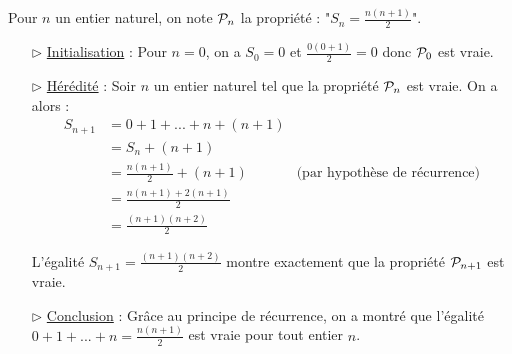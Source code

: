 \begin{sol}
Pour $n$ un entier naturel, on note ${\cal P}_n$ la propri\'et\'e : "$S_n =  \frac{n(n+1)}{2}$".

\begin{itemize}

\item[$\triangleright$]
\underline{Initialisation} : 
Pour $n=0$, on a $S_0 =0$ et $\frac{0(0+1)}{2}=0$ donc ${\cal P}_0$ est vraie.

\item[$\triangleright$]
\underline{H\'er\'edit\'e} : 
Soir $n$ un entier naturel tel que la propri\'et\'e ${\cal P}_n$ est vraie. 
On a alors :
\begin{align*}
S_{n+1} &= 0+1+...+n+(n+1)& \\
	     &=S_n + (n+1)& \\
	     &=\frac{n(n+1)}{2} + (n+1) & {\text {(par hypoth\`ese de r\'ecurrence)}}\\
	     &= \frac{n(n+1) + 2(n+1)}{2}& \\
	&= \frac{(n+1)(n+2)}{2}& 
\end{align*}

L'\'egalit\'e $S_{n+1} = \frac{(n+1)(n+2)}{2}$ montre exactement que la propri\'et\'e ${\cal P}_{n+1}$ est vraie.

\item[$\triangleright$]
\underline {Conclusion} :
Grâce au principe de r\'ecurrence, on a montr\'e que l'\'egalit\'e $0+1+ ...+n =  \frac{n(n+1)}{2}$ est vraie pour tout entier $n$.

\end{itemize}
\end{sol}

